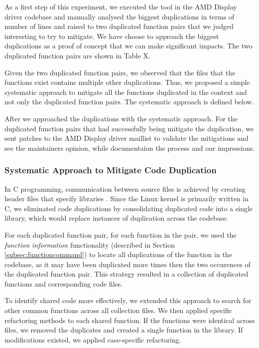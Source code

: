 As a first step of this experiment, we executed the tool in the AMD Display driver codebase and 
manually analysed the biggest duplications in terms of number of lines and raised to 
two duplicated function pairs that we judged interesting to try to mitigate. 
We have choose to approach the biggest duplications as a proof of concept that 
we can make significant impacts. The two duplicated function pairs are shown in Table X.

Given the two duplicated function pairs, we observed that the files that the functions exist contains 
multiple other duplications. Thus, we proposed a simple systematic approach to mitigate all the 
functions duplicated in the context and not only the duplicated function pairs. 
The systematic approach is defined below.

After we approached the duplications with the systematic approach. For the duplicated function
pairs that had successfully being mitigate the duplication, we sent patches to the AMD Display driver
maillist to validate the mitigations and see the maintainers opinion, while documentaion the process 
and our impressions.

\subsubsection{Systematic Approach to Mitigate Code Duplication}

In C programming, communication between source files is achieved by creating header files that specify 
libraries \citep{Cbook}. Since the Linux kernel is primarily written in C, we eliminated code duplications 
by consolidating duplicated code into a single library, which would replace instances of 
duplication across the codebase.

For each duplicated function pair, for each function in the pair, we used the \textit{function information} functionality 
(described in Section \ref{subsec:functioncommand}) to locate all duplications of the function in the codebase, 
as it may have been duplicated more times then the two occurences of the duplicated function pair. 
This strategy resulted in a collection of duplicated functions and corresponding code files.

To identify shared code more effectively, we extended this approach to search for other common 
functions across all collection files. We then applied specific refactoring methods to each shared 
function. If the functions were identical across files, we removed the duplicates and created a single 
function in the library. If modifications existed, we applied case-specific refactoring.

